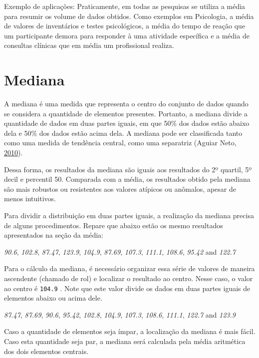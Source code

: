 \documentclass[
]{book}
\begin{document}
Exemplo de aplicações: Praticamente, em todas as pesquisas se utiliza a
média para resumir os volume de dados obtidos. Como exemplos em
Psicologia, a média de valores de inventários e testes psicológicos, a
média do tempo de reação que um participante demora para responder à uma
atividade específica e a média de consultas clínicas que em média um
profissional realiza.

\hypertarget{mediana}{%
\section{Mediana}\label{mediana}}

A mediana é uma medida que representa o centro do conjunto de dados
quando se considera a quantidade de elementos presentes. Portanto, a
mediana divide a quantidade de dados em duas partes iguais, em que 50\%
dos dados estão abaixo dela e 50\% dos dados estão acima dela. A mediana
pode ser classificada tanto como uma medida de tendência central, como
uma separatriz (Aguiar Neto, \protect\hyperlink{ref-neto2010}{2010}).

Dessa forma, os resultados da mediana são iguais aos resultados do 2º
quartil, 5º decil e percentil 50. Comparada com a média, os resultados
obtido pela mediana são mais robustos ou resistentes aos valores
atípicos ou anômalos, apesar de menos intuitivos.

Para dividir a distribuição em duas partes iguais, a realização da
mediana precisa de alguns procedimentos. Repare que abaixo estão os
mesmo resultados apresentados na seção da média:

\emph{90.6}, \emph{102.8}, \emph{87.47}, \emph{123.9}, \emph{104.9},
\emph{87.69}, \emph{107.3}, \emph{111.1}, \emph{108.6}, \emph{95.42} and
\emph{122.7}

Para o cálculo da mediana, é necessário organizar essa série de valores
de maneira ascendente (chamado de rol) e localizar o resultado ao
centro. Nesse caso, o valor ao centro é \texttt{104.9} . Note que este
valor divide os dados em duas partes iguais de elementos abaixo ou acima
dele.

\emph{87.47}, \emph{87.69}, \emph{90.6}, \emph{95.42}, \emph{102.8},
\emph{104.9}, \emph{107.3}, \emph{108.6}, \emph{111.1}, \emph{122.7} and
\emph{123.9}

Caso a quantidade de elementos seja ímpar, a localização da mediana é
mais fácil. Caso esta quantidade seja par, a mediana será calculada pela
média aritmética dos dois elementos centrais.
\end{document}
